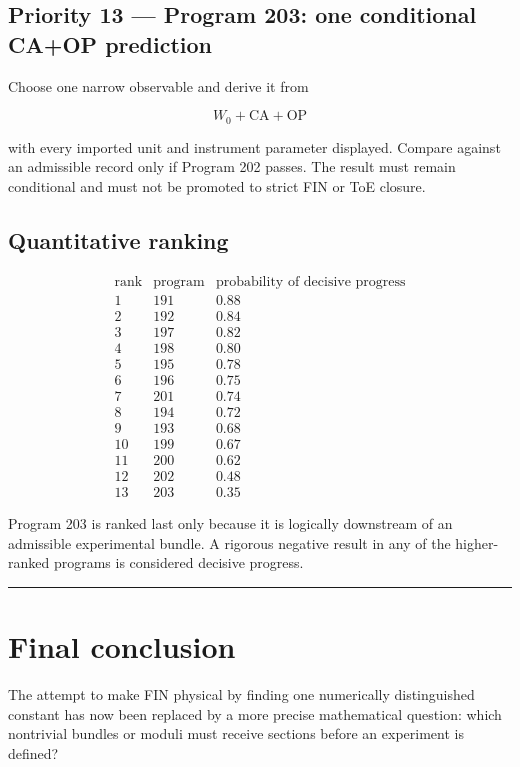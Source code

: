 \documentclass[11pt,a4paper,openany]{report}
\begin{document}
\section{Priority 13 --- Program 203: one conditional CA+OP prediction}

Choose one narrow observable and derive it from

\[
W_0+\mathrm{CA}+\mathrm{OP}
\]

with every imported unit and instrument parameter displayed. Compare against an admissible record only if Program 202 passes. The result must remain conditional and must not be promoted to strict FIN or ToE closure.

\section{Quantitative ranking}

\[
\begin{array}{c|c|c}
\text{rank}&\text{program}&\text{probability of decisive progress}\\
\hline
1&191&0.88\\
2&192&0.84\\
3&197&0.82\\
4&198&0.80\\
5&195&0.78\\
6&196&0.75\\
7&201&0.74\\
8&194&0.72\\
9&193&0.68\\
10&199&0.67\\
11&200&0.62\\
12&202&0.48\\
13&203&0.35
\end{array}
\]

Program 203 is ranked last only because it is logically downstream of an admissible experimental bundle. A rigorous negative result in any of the higher-ranked programs is considered decisive progress.

\par\medskip\hrule\medskip

\chapter{Final conclusion}

The attempt to make FIN physical by finding one numerically distinguished constant has now been replaced by a more precise mathematical question: which nontrivial bundles or moduli must receive sections before an experiment is defined?
\end{document}

